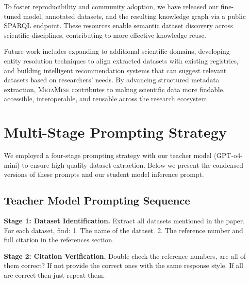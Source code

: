 \documentclass[runningheads]{llncs}
\begin{document}
To foster reproducibility and community adoption, we have released our fine-tuned model, annotated datasets, and the resulting knowledge graph via a public SPARQL endpoint. These resources enable semantic dataset discovery across scientific disciplines, contributing to more effective knowledge reuse.

Future work includes expanding to additional scientific domains, developing entity resolution techniques to align extracted datasets with existing registries, and building intelligent recommendation systems that can suggest relevant datasets based on researchers' needs. By advancing structured metadata extraction, \textsc{MetaMine} contributes to making scientific data more findable, accessible, interoperable, and reusable across the research ecosystem.
%
%
%

%

\appendix
\section{Multi-Stage Prompting Strategy}
\label{appendix:prompts}

We employed a four-stage prompting strategy with our teacher model (GPT-o4-mini) to ensure high-quality dataset extraction. Below we present the condensed versions of these prompts and our student model inference prompt.

\subsection{Teacher Model Prompting Sequence}

\noindent\textbf{Stage 1: Dataset Identification.} Extract all datasets mentioned in the paper. For each dataset, find: 1. The name of the dataset. 2. The reference number and full citation in the references section.

\medskip
\noindent\textbf{Stage 2: Citation Verification.} Double check the reference numbers, are all of them correct? If not provide the correct ones with the same response style. If all are correct then just repeat them.
\end{document}
